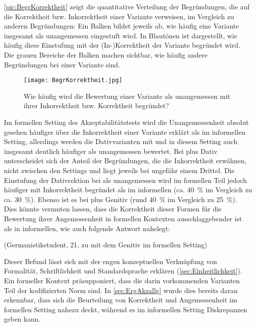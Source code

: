 \autoref{pic:BegrKorrektheit} zeigt die quantitative Verteilung der Begründungen, die auf die Korrektheit bzw. Inkorrektheit einer Variante verweisen, im Vergleich zu anderen Begründungen: 
Ein Balken bildet jeweils ab, wie häufig eine Variante insgesamt als unangemessen eingestuft wird. 
In Blautönen ist dargestellt, wie häufig diese Einstufung mit der (In-)Korrektheit der Variante begründet wird. 
Die grauen Bereiche der Balken machen sichtbar, wie häufig andere Begründungen bei einer Variante sind. 
\begin{figure}
\texttt{[image: BegrKorrektheit.jpg]}
\caption{Wie häufig wird die Bewertung einer Variante als unangemessen mit ihrer Inkorrektheit bzw. Korrektheit begründet?}
\label{pic:BegrKorrektheit}
\end{figure}

Im formellen Setting des Akzeptabilitätstests wird die Unangemessenheit absolut gesehen häufiger über die Inkorrektheit einer Variante erklärt als im informellen Setting, allerdings werden die Dativvarianten mit \wegen{} und \waehrend{} in diesem Setting auch insgesamt deutlich häufiger als unangemessen bewertet. 
Bei \wegen{} plus Dativ unterscheidet sich der Anteil der Begründungen, die die Inkorrektheit erwähnen, nicht zwischen den Settings und liegt jeweils bei ungefähr einem Drittel. 
Die Einstufung der Dativrektion bei \waehrend{} als unangemessen wird im formellen Teil jedoch häufiger mit Inkorrektheit begründet als im informellen (ca. 40~\% im Vergleich zu ca. 30~\%). 
Ebenso ist es bei \gegenueber{} plus Genitiv (rund 40~\% im Vergleich zu 25~\%). 
Dies könnte vermuten lassen, dass die Korrektheit dieser Formen für die Bewertung ihrer Angemessenheit in formellen Kontexten ausschlaggebender ist als in informellen, wie auch folgende Antwort nahelegt: 
\begin{exe}
\ex {} (Germanistikstudent, 21, zu \gegenueber{} mit dem Genitiv im formellen Setting)
\end{exe} 
Dieser Befund lässt sich mit der engen konzeptuellen Verknüpfung von Formalität, Schriftlichkeit und Standardsprache erklären (\autoref{sec:Einheitlichkeit}). 
Ein formeller Kontext präsupponiert, dass die darin vorkommenden Varianten Teil der kodifizierten Norm sind. 
In \autoref{sec:ErgAkzallg} wurde dies bereits daran erkennbar, dass sich die Beurteilung von Korrektheit und Angemessenheit im formellen Setting nahezu deckt, während es im informellen Setting Diskrepanzen geben kann. 

